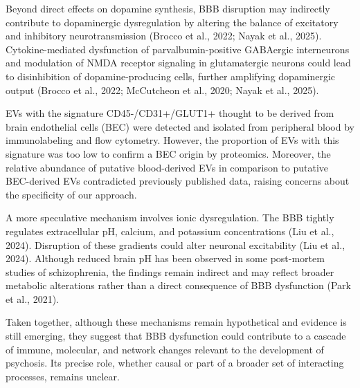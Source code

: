 \documentclass[authordate, empirical]{jote-new-article}
\begin{document}
	Beyond direct effects on dopamine synthesis, BBB disruption may indirectly contribute to dopaminergic dysregulation by altering the balance of excitatory and inhibitory neurotransmission (Brocco et al., 2022; Nayak et al., 2025). Cytokine-mediated dysfunction of parvalbumin-positive GABAergic interneurons and modulation of NMDA receptor signaling in glutamatergic neurons could lead to disinhibition of dopamine-producing cells, further amplifying dopaminergic output (Brocco et al., 2022; McCutcheon et al., 2020; Nayak et al., 2025).



	\begin{takeHomeMessage}EVs with the signature CD45-/CD31+/GLUT1+ thought to be derived from brain endothelial cells (BEC) were detected and isolated from peripheral blood by immunolabeling and flow cytometry. However, the proportion of EVs with this signature was too low to confirm a BEC origin by proteomics. Moreover, the relative abundance of putative blood-derived EVs in comparison to putative BEC-derived EVs contradicted previously published data, raising concerns about the specificity of our approach.
	\end{takeHomeMessage}

	A more speculative mechanism involves ionic dysregulation. The BBB tightly regulates extracellular pH, calcium, and potassium concentrations (Liu et al., 2024). Disruption of these gradients could alter neuronal excitability (Liu et al., 2024). Although reduced brain pH has been observed in some post-mortem studies of schizophrenia, the findings remain indirect and may reflect broader metabolic alterations rather than a direct consequence of BBB dysfunction (Park et al., 2021).



	Taken together, although these mechanisms remain hypothetical and evidence is still emerging, they suggest that BBB dysfunction could contribute to a cascade of immune, molecular, and network changes relevant to the development of psychosis. Its precise role, whether causal or part of a broader set of interacting processes, remains unclear.
\end{document}
